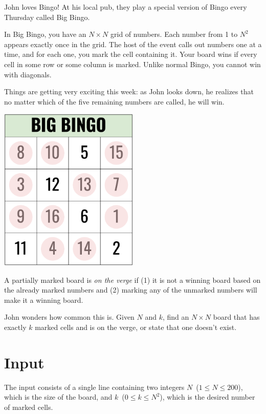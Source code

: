 
John loves Bingo! At his local pub, they play a special version of Bingo every Thursday called Big Bingo.

In Big Bingo, you have an $N \times N$ grid of numbers. Each number from 1 to $N^2$ appears exactly once in the grid. The host of the event calls out numbers one at a time, and for each one, you mark the cell containing it. Your board wins if every cell in some row or some column is marked. Unlike normal Bingo, you cannot win with diagonals.

Things are getting very exciting this week: as John looks down, he realizes that no matter which of the five remaining numbers are called, he will win.

\begin{center}
 \includegraphics[width=0.5\textwidth]{BigBingo}
\end{center}

A partially marked board is \textit{on the verge} if (1) it is not a winning board based on the already marked numbers and (2) marking any of the unmarked numbers will make it a winning board.

John wonders how common this is. Given $N$ and $k$, find an $N \times N$ board that has exactly $k$ marked cells and is on the verge, or state that one doesn't exist.



\section*{Input}

The input consists of a single line containing two integers $N$~($1 \leq N \leq 200$), which is the size of the board, and $k$~($0 \leq k \leq N^2$), which is the desired number of marked cells.


